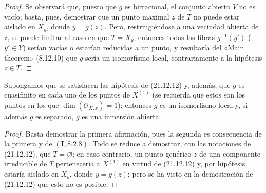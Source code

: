 \begin{proof}
Se observará que, puesto que $g$ es birracional, el conjunto abierto $V$ no es vacío; basta,
pues, demostrar que un punto maximal $z$ de $T$ no puede estar aislado en $X_y$,
donde $y=g(z)$. Pero, restringiéndose a una vecindad abierta de $z$, se puede
limitar al caso en que $T=X_y$; entonces todas las fibras $g^{-1}(y')$ ($y'\in Y$) serían
vacías o estarían reducidas a un punto, y resultaría del «Main theorem» (8.12.10) que $g$
sería un isomorfismo local, contrariamente a la hipótesis $z\in T$.
\end{proof}

\begin{corollary}[21.12.13]
\label{IV.21.12.13}
Supongamos que se satisfacen las hipótesis de \textup{(21.12.12)} y, además, que $g$ es
cuasifinito en cada uno de los puntos de $X^{(1)}$ \textup{(se recuerda que estos son los puntos en los que
$\dim(\mathcal O_{X,x})=1$)}; entonces $g$ es un isomorfismo local y, si además $g$ es
separado, $g$ es una inmersión abierta.
\end{corollary}

\begin{proof}
Basta demostrar la primera afirmación, pues la segunda es consecuencia de la
primera y de $(\mathbf I, 8.2.8)$. Todo se reduce a demostrar, con las notaciones de
(21.12.12), que $T=\varnothing$; en caso contrario, un punto genérico $z$ de una
componente irreducible de $T$ pertenecería a $X^{(1)}$ en virtud de (21.12.12) y, por
hipótesis, estaría aislado en $X_y$, donde $y=g(z)$; pero se ha visto en la demostración
de (21.12.12) que esto no es posible.
\end{proof}

